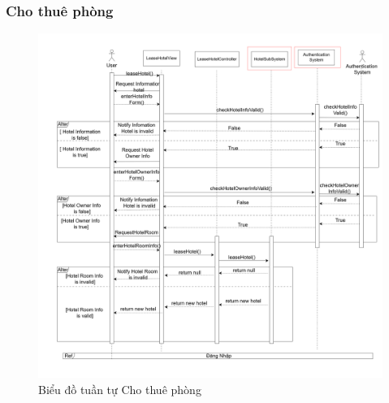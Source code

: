 \subsubsection{Cho thuê phòng}
\begin{figure}[H]
    \centering
    \includegraphics[width=\textwidth]{img3.4/chothuephong.png} 
    \caption{Biểu đồ tuần tự Cho thuê phòng}
\end{figure}

